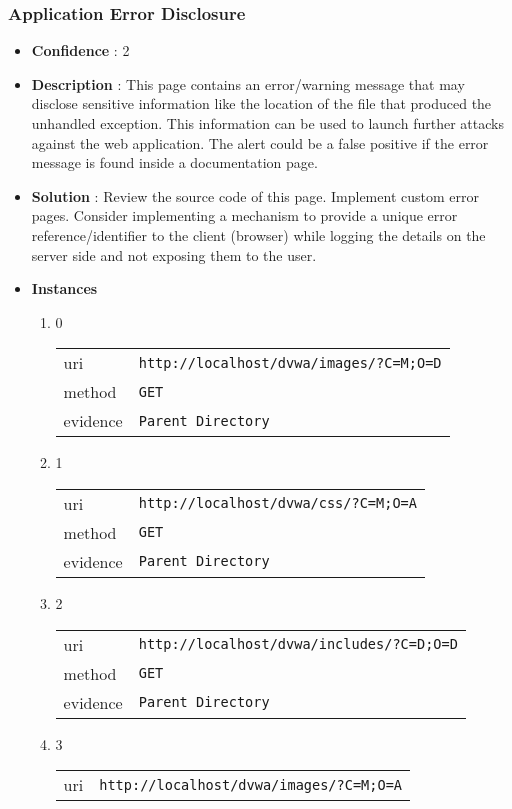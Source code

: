 \documentclass[10pt]{article}
\begin{document}
\subsubsection{Application Error Disclosure}
\begin{itemize}
\item[] \textbf{Confidence} : 2
\item[] \textbf{Description} : This page contains an error/warning message that may disclose sensitive information like the location of the file that produced the unhandled exception. This information can be used to launch further attacks against the web application. The alert could be a false positive if the error message is found inside a documentation page.
\item[] \textbf{Solution} :  Review the source code of this page. Implement custom error pages. Consider implementing a mechanism to provide a unique error reference/identifier to the client (browser) while logging the details on the server side and not exposing them to the user.
\item[] \textbf{Instances}
\begin{enumerate}
\item[] 0
\begin{tabular}{| l | p{12cm}}
uri & \texttt{http://localhost/dvwa/images/?C=M;O=D} \\
method & \texttt{GET} \\
evidence & \texttt{Parent Directory} \\
\end{tabular}
\item[] 1
\begin{tabular}{| l | p{12cm}}
uri & \texttt{http://localhost/dvwa/css/?C=M;O=A} \\
method & \texttt{GET} \\
evidence & \texttt{Parent Directory} \\
\end{tabular}
\item[] 2
\begin{tabular}{| l | p{12cm}}
uri & \texttt{http://localhost/dvwa/includes/?C=D;O=D} \\
method & \texttt{GET} \\
evidence & \texttt{Parent Directory} \\
\end{tabular}
\item[] 3
\begin{tabular}{| l | p{12cm}}
uri & \texttt{http://localhost/dvwa/images/?C=M;O=A} \\

\end{tabular}
\end{enumerate}
\end{itemize}
\end{document}
